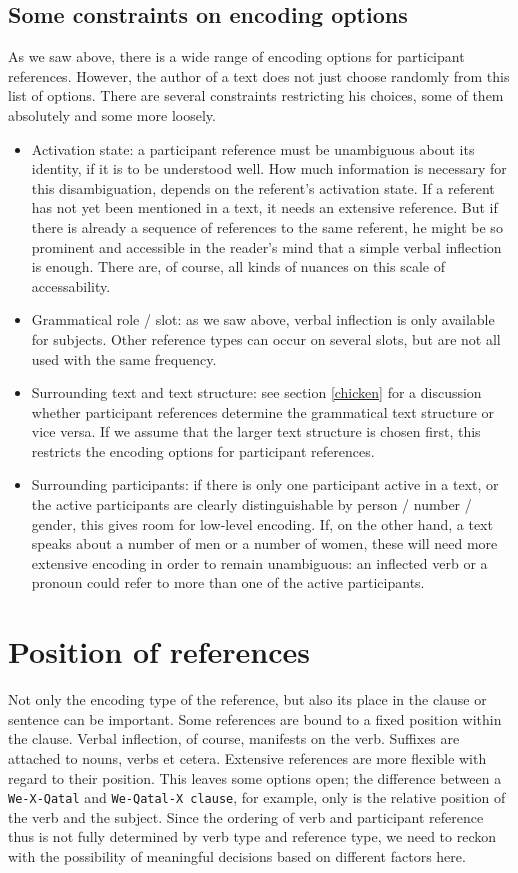 \documentclass{report}
\newcommand{\mi}[1]{\lstinline{#1}}
\begin{document}
\subsection{Some constraints on encoding options}
As we saw above, there is a wide range of encoding options for participant references. However, the author of a text does not just choose randomly from this list of options. There are several constraints restricting his choices, some of them absolutely and some more loosely. 
\begin{itemize}
\item Activation state: a participant reference must be unambiguous about its identity, if it is to be understood well. How much information is necessary for this disambiguation, depends on the referent's activation state. If a referent has not yet been mentioned in a text, it needs an extensive reference. But if there is already a sequence of references to the same referent, he might be so prominent and accessible in the reader's mind that a simple verbal inflection is enough. There are, of course, all kinds of nuances on this scale of accessability.
\item Grammatical role / slot: as we saw above, verbal inflection is only available for subjects. Other reference types can occur on several slots, but are not all used with the same frequency.
\item Surrounding text and text structure: see section \ref{chicken} for a discussion whether participant references determine the grammatical text structure or vice versa. If we assume that the larger text structure is chosen first, this restricts the encoding options for participant references. 
\item Surrounding participants: if there is only one participant active in a text, or the active participants are clearly distinguishable by person / number / gender, this gives room for low-level encoding. If, on the other hand, a text speaks about a number of men or a number of women, these will need more extensive encoding in order to remain unambiguous: an inflected verb or a pronoun could refer to more than one of the active participants.
\end{itemize}

\section{Position of references}
Not only the encoding type of the reference, but also its place in the clause or sentence can be important. Some references are bound to a fixed position within the clause. Verbal inflection, of course, manifests on the verb. Suffixes are attached to nouns, verbs et cetera. Extensive references are more flexible with regard to their position. This leaves some options open; the difference between a \mi{We-X-Qatal} and \mi{We-Qatal-X clause}, for example, only is the relative position of the verb and the subject. Since the ordering of verb and participant reference thus is not fully determined by verb type and reference type, we need to reckon with the possibility of meaningful decisions based on different factors here.
\end{document}
